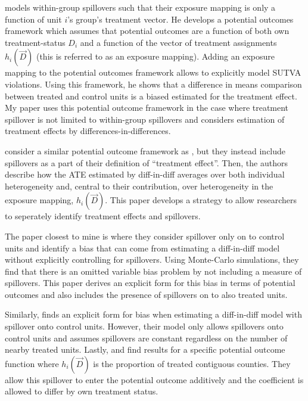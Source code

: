 \documentclass[11pt]{article}
\begin{document}
\citet{Vazquez-Bare_2019} models within-group spillovers such that their exposure mapping is only a function of unit $i$'s group's treatment vector. He develops a potential outcomes framework which assumes that potential outcomes are a function of both own treatment-status $D_i$ and a function of the vector of treatment assignments $h_i(\vec{D})$ (this is referred to as an exposure mapping). Adding an exposure mapping to the potential outcomes framework allows to explicitly model SUTVA violations. Using this framework, he shows that a difference in means comparison between treated and control units is a biased estimated for the treatment effect. My paper uses this potential outcome framework in the case where treatment spillover is not limited to within-group spillovers and considers estimation of treatment effects by differences-in-differences. 

\citet{Sävje_Aronow_Hudgens_2019} consider a similar potential outcome framework as \citet{Vazquez-Bare_2019}, but they instead include spillovers as a part of their definition of ``treatment effect''. Then, the authors describe how the ATE estimated by diff-in-diff averages over both individual heterogeneity and, central to their contribution, over heterogeneity in the exposure mapping, $h_i(\vec{D})$. This paper develops a strategy to allow researchers to seperately identify treatment effects and spillovers.

The paper closest to mine is \citet{Delgado_Florax_2015} where they consider spillover only on to control units and identify a bias that can come from estimating a diff-in-diff model without explicitly controlling for spillovers. Using Monte-Carlo simulations, they find that there is an omitted variable bias problem by not including a measure of spillovers. This paper derives an explicit form for this bias in terms of potential outcomes and also includes the presence of spillovers on to also treated units.

Similarly, \citet{Clarke_2017} finds an explicit form for bias when estimating a diff-in-diff model with spillover onto control units. However, their model only allows spillovers onto control units and assumes spillovers are constant regardless on the number of nearby treated units. Lastly, \citet{Berg_Streitz_2019} and \citet{Verbitsky-Savitz_Raudenbush_2012} find results for a specific potential outcome function where $h_i(\vec{D})$ is the proportion of treated contiguous counties. They allow this spillover to enter the potential outcome additively and the coefficient is allowed to differ by own treatment status.
\end{document}
